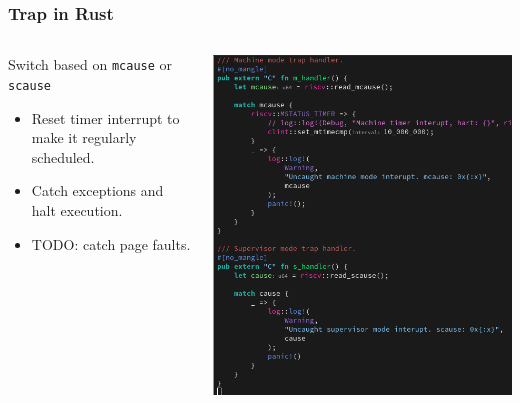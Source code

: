 \documentclass{beamer}
\begin{document}
\begin{frame}[fragile]
  \frametitle{Trap in Rust}
  \begin{columns}
    \begin{column}{0.5\textwidth}
      Switch based on \verb_mcause_ or \verb_scause_
      \begin{itemize}
      \item Reset timer interrupt to make it regularly scheduled.\\
      \item Catch exceptions and halt execution.\\
      \item TODO: catch page faults.
      \end{itemize}
    \end{column}
    \begin{column}{0.5\textwidth}
      \includegraphics[width=\textwidth]{traprs.png}
    \end{column}
  \end{columns}
\end{frame}
\end{document}
